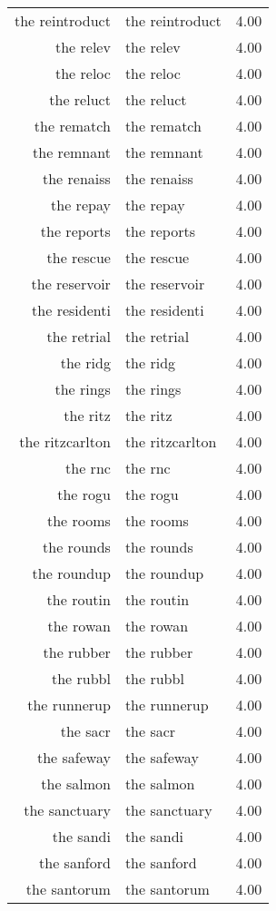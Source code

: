 \begin{table}[ht]
\begin{tabular}{rlr}
  the reintroduct & the reintroduct & 4.00 \\ 
  the relev & the relev & 4.00 \\ 
  the reloc & the reloc & 4.00 \\ 
  the reluct & the reluct & 4.00 \\ 
  the rematch & the rematch & 4.00 \\ 
  the remnant & the remnant & 4.00 \\ 
  the renaiss & the renaiss & 4.00 \\ 
  the repay & the repay & 4.00 \\ 
  the reports & the reports & 4.00 \\ 
  the rescue & the rescue & 4.00 \\ 
  the reservoir & the reservoir & 4.00 \\ 
  the residenti & the residenti & 4.00 \\ 
  the retrial & the retrial & 4.00 \\ 
  the ridg & the ridg & 4.00 \\ 
  the rings & the rings & 4.00 \\ 
  the ritz & the ritz & 4.00 \\ 
  the ritzcarlton & the ritzcarlton & 4.00 \\ 
  the rnc & the rnc & 4.00 \\ 
  the rogu & the rogu & 4.00 \\ 
  the rooms & the rooms & 4.00 \\ 
  the rounds & the rounds & 4.00 \\ 
  the roundup & the roundup & 4.00 \\ 
  the routin & the routin & 4.00 \\ 
  the rowan & the rowan & 4.00 \\ 
  the rubber & the rubber & 4.00 \\ 
  the rubbl & the rubbl & 4.00 \\ 
  the runnerup & the runnerup & 4.00 \\ 
  the sacr & the sacr & 4.00 \\ 
  the safeway & the safeway & 4.00 \\ 
  the salmon & the salmon & 4.00 \\ 
  the sanctuary & the sanctuary & 4.00 \\ 
  the sandi & the sandi & 4.00 \\ 
  the sanford & the sanford & 4.00 \\ 
  the santorum & the santorum & 4.00 \\ 

\end{tabular}
\end{table}
